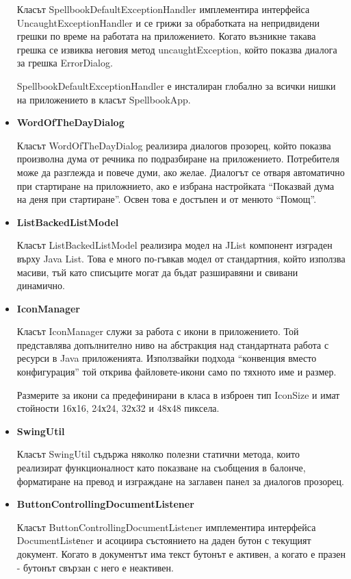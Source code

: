 \begin{itemize}
    Класът SpellbookDefaultExceptionHandler имплементира интерфейса
    UncaughtExceptionHandler и се грижи за обработката на непридвидени
    грешки по време на работата на приложението. Когато възникне
    такава грешка се извиква неговия метод uncaughtException, който
    показва диалога за грешка ErrorDialog.

    SpellbookDefaultExceptionHandler е инсталиран глобално за всички
    нишки на приложението в класът SpellbookApp.
  \item \textbf{WordOfTheDayDialog}

    Класът WordOfTheDayDialog реализира диалогов прозорец, който
    показва произволна дума от речника по подразбиране на
    приложението. Потребителя може да разглежда и повече думи, ако
    желае. Диалогът се отваря автоматично при стартиране на
    приложнието, ако е избрана настройката "`Показвай дума на деня при
    стартиране"'. Освен това е достъпен и от менюто "`Помощ"'.

  \item \textbf{ListBackedListModel}

    Класът ListBackedListModel реализира модел на JList компонент
    изграден върху Java List. Това е много по-гъвкав модел от
    стандартния, който използва масиви, тъй като списъците могат да
    бъдат разширавяни и свивани динамично. 
  \item \textbf{IconManager}

    Класът IconManager служи за работа с икони в приложението. Той
    представлява допълнително ниво на абстракция над стандартната
    работа с ресурси в Java приложенията. Използвайки подхода
    "`конвенция вместо конфигурация"' той открива файловете-икони само
    по тяхното име и размер. 

    Размерите за икони са предефинирани в класа в изброен тип IconSize
    и имат стойности 16х16, 24х24, 32х32 и 48х48 пиксела. 
  \item \textbf{SwingUtil}

    Класът SwingUtil съдържа няколко полезни статични метода, които
    реализират функционалност като показване на съобщения в балонче,
    форматиране на превод и изграждане на заглавен панел за диалогов
    прозорец. 
  \item \textbf{ButtonControllingDocumentListener}

    Класът ButtonControllingDocumentListener имплементира интерфейса
    DocumentListеner и асоциира състоянието на даден бутон с текущият
    документ. Когато в документът има текст бутонът е активен, а
    когато е празен - бутонът свързан с него е неактивен.
\end{itemize}
 
